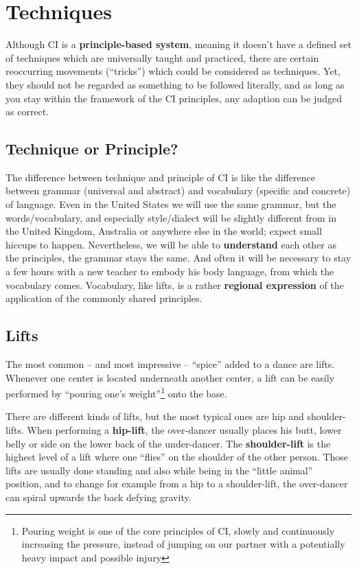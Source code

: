 \chapter{Techniques}\label{ch:techniques}


Although CI is a \textbf{principle-based system}, meaning it doesn't have a defined set of techniques which are universally taught and practiced, there are certain reoccurring movements (``tricks'') which could be considered as techniques.
Yet, they should not be regarded as something to be followed literally, and as long as you stay within the framework of the CI principles, any adaption can be judged as correct.

\section{Technique or Principle?}\label{sec:technique-or-principle?}

The difference between technique and principle of CI is like the difference between grammar (universal and abstract) and vocabulary (specific and concrete) of language.
Even in the United States we will use the same grammar, but the words/vocabulary, and especially style/dialect will be slightly different from in the United Kingdom, Australia or anywhere else in the world; expect small hiccups to happen.
Nevertheless, we will be able to \textbf{understand} each other as the principles, the grammar stays the same.
And often it will be necessary to stay a few hours with a new teacher to embody his body language, from which the vocabulary comes.
Vocabulary, like lifts, is a rather \textbf{regional expression} of the application of the commonly shared principles.

\section{Lifts}\label{sec:lifts}

The most common -- and most impressive -- ``spice'' added to a dance are lifts.
Whenever one center is located underneath another center, a lift can be easily performed by ``pouring one's weight''\footnote{Pouring weight is one of the core principles of CI, slowly and continuously increasing the pressure, instead of jumping on our partner with a potentially heavy impact and possible injury} onto the base.

There are different kinds of lifts, but the most typical ones are hip and shoulder-lifts.
When performing a \textbf{hip-lift}, the \gls{over-dancer} usually places his butt, lower belly or side on the lower back of the \gls{under-dancer}.
The \textbf{shoulder-lift} is the highest level of a lift where one ``flies'' on the shoulder of the other person.
Those lifts are usually done standing and also while being in the ``little animal'' position, and to change for example from a hip to a shoulder-lift, the over-dancer can spiral upwards the back defying gravity.

